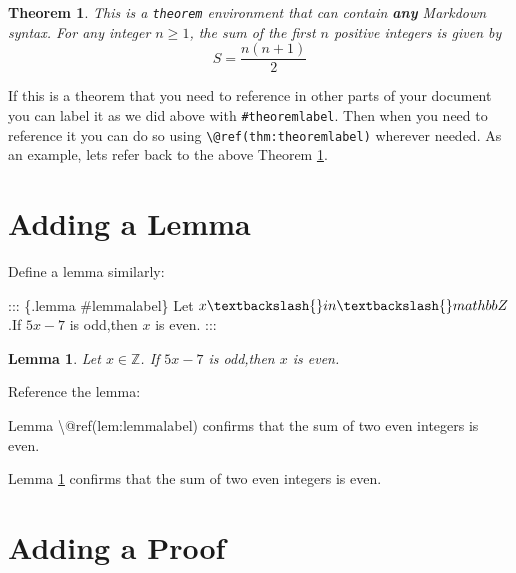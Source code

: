 \documentclass[
]{book}
\newenvironment{Shaded}{\begin{snugshade}}{\end{snugshade}}
\newcommand{\NormalTok}[1]{#1}
\newtheorem{theorem}{Theorem}[chapter]
\newtheorem{lemma}{Lemma}[chapter]
\theoremstyle{definition}
\theoremstyle{definition}
\theoremstyle{definition}
\theoremstyle{definition}
\theoremstyle{remark}
\begin{document}
\begin{theorem}
\protect\hypertarget{thm:theoremlabel}{}\label{thm:theoremlabel}This is a \texttt{theorem} environment that can contain \textbf{any}
\emph{Markdown} syntax.
For any integer \(n \geq 1\), the sum of the first \(n\) positive integers is given by
\[
S = \frac{n(n + 1)}{2}
\]
\end{theorem}

If this is a theorem that you need to reference in other parts of your document you can label it as we did above with \texttt{\#theoremlabel}. Then when you need to reference it you can do so using \texttt{\textbackslash{}@ref(thm:theoremlabel)} wherever needed. As an example, lets refer back to the above Theorem \ref{thm:theoremlabel}.

\section{Adding a Lemma}\label{adding-a-lemma}

Define a lemma similarly:

\begin{Shaded}
\begin{Highlighting}[]
\NormalTok{::: \{.lemma \#lemmalabel\}}
\NormalTok{Let $x\textbackslash{}in \textbackslash{}mathbb Z$.If $5x{-}7$ is odd,then $x$ is even.}
\NormalTok{:::}
\end{Highlighting}
\end{Shaded}

\begin{lemma}
\protect\hypertarget{lem:lemmalabel}{}\label{lem:lemmalabel}Let \(x \in \mathbb Z\). If \(5x-7\) is odd,then \(x\) is even.
\end{lemma}

Reference the lemma:

\begin{Shaded}
\begin{Highlighting}[]
\NormalTok{Lemma \textbackslash{}@ref(lem:lemmalabel) confirms that the sum of two even integers is even.}
\end{Highlighting}
\end{Shaded}

Lemma \ref{lem:lemmalabel} confirms that the sum of two even integers is even.

\section{Adding a Proof}\label{adding-a-proof}
\end{document}
